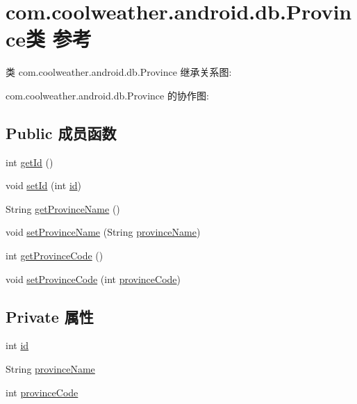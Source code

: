 \hypertarget{classcom_1_1coolweather_1_1android_1_1db_1_1_province}{}\section{com.\+coolweather.\+android.\+db.\+Province类 参考}
\label{classcom_1_1coolweather_1_1android_1_1db_1_1_province}


类 com.\+coolweather.\+android.\+db.\+Province 继承关系图\+:


com.\+coolweather.\+android.\+db.\+Province 的协作图\+:
\subsection*{Public 成员函数}
\begin{DoxyCompactItemize}
\item 
int \mbox{\hyperlink{classcom_1_1coolweather_1_1android_1_1db_1_1_province_a6bdad8632a72515493ea66cbe41fab58}{get\+Id}} ()
\item 
void \mbox{\hyperlink{classcom_1_1coolweather_1_1android_1_1db_1_1_province_a67382467cd32a8cd81a9ac5904160704}{set\+Id}} (int \mbox{\hyperlink{classcom_1_1coolweather_1_1android_1_1db_1_1_province_ac540d3c30863d2b1de5b7f118fb13d2d}{id}})
\item 
String \mbox{\hyperlink{classcom_1_1coolweather_1_1android_1_1db_1_1_province_a66c7fc246237c8f66c9315ca1d603ff7}{get\+Province\+Name}} ()
\item 
void \mbox{\hyperlink{classcom_1_1coolweather_1_1android_1_1db_1_1_province_a730f3e057093c3634c05008dfc4c4e69}{set\+Province\+Name}} (String \mbox{\hyperlink{classcom_1_1coolweather_1_1android_1_1db_1_1_province_ac9db3f49edffdd300e23d111b86442d6}{province\+Name}})
\item 
int \mbox{\hyperlink{classcom_1_1coolweather_1_1android_1_1db_1_1_province_a8261b0f420fd4986105e460e9571b507}{get\+Province\+Code}} ()
\item 
void \mbox{\hyperlink{classcom_1_1coolweather_1_1android_1_1db_1_1_province_a8f3cddcb65a024eceb8d0d555b1cdc20}{set\+Province\+Code}} (int \mbox{\hyperlink{classcom_1_1coolweather_1_1android_1_1db_1_1_province_a62f5c6e345853cc18479086b576149db}{province\+Code}})
\end{DoxyCompactItemize}
\subsection*{Private 属性}
\begin{DoxyCompactItemize}
\item 
int \mbox{\hyperlink{classcom_1_1coolweather_1_1android_1_1db_1_1_province_ac540d3c30863d2b1de5b7f118fb13d2d}{id}}
\item 
String \mbox{\hyperlink{classcom_1_1coolweather_1_1android_1_1db_1_1_province_ac9db3f49edffdd300e23d111b86442d6}{province\+Name}}
\item 
int \mbox{\hyperlink{classcom_1_1coolweather_1_1android_1_1db_1_1_province_a62f5c6e345853cc18479086b576149db}{province\+Code}}
\end{DoxyCompactItemize}


